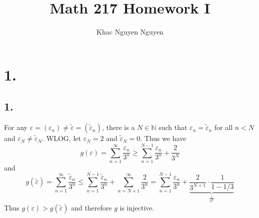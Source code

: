 \documentclass[11pt]{article}
\title{\textbf{Math 217 Homework I}}
\author{Khac Nguyen Nguyen}
\date{}
\theoremstyle{mystyle}
\theoremstyle{definition}
\begin{document}
\section*{1.}
\subsection*{1.}
For any $\varepsilon = (\varepsilon_n) \ne \tilde{\varepsilon} = (\tilde{\varepsilon}_n)$, there is a $N \in \mathbb{N}$ such that $\varepsilon_n = \tilde{\varepsilon}_n$ for all $n < N$ and $\varepsilon_N \ne \tilde{\varepsilon}_N$. WLOG, let $\varepsilon_N = 2$ and $\tilde{\varepsilon}_N = 0$. Thus we have 
\[
  g(\varepsilon) = \sum_{n=1}^\infty \frac{\varepsilon_n}{3^n} \ge \sum_{n=1}^{N-1} \frac{\varepsilon_n}{3^n} + \displaystyle\frac{2}{3^N}
\]
and 
\[
  g(\tilde{\varepsilon}) 
  = \sum_{n=1}^\infty \displaystyle\frac{\tilde{\varepsilon}_n}{3^n} 
  \le \sum_{n=1}^{N-1} \displaystyle\frac{\tilde{\varepsilon}_n}{3^n} + \sum_{n=N+1}^\infty \displaystyle\frac{2}{3^n}
  = \sum_{n=1}^{N-1} \displaystyle\frac{\varepsilon_n}{3^n} + \underbrace{\displaystyle\frac{2}{3^{N+1}} \cdot \frac{1}{1-1/3}}_{\frac{1}{3^N}}
\]
Thus $g(\varepsilon) > g(\tilde{\varepsilon})$ and therefore $g$ is injective.
\end{document}
